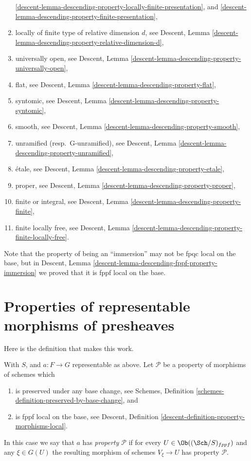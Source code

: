 \begin{remark}
\begin{enumerate}
\ref{descent-lemma-descending-property-locally-finite-presentation}, and
\ref{descent-lemma-descending-property-finite-presentation},
\item locally of finite type of relative dimension $d$, see
Descent,
Lemma \ref{descent-lemma-descending-property-relative-dimension-d},
\item universally open, see
Descent, Lemma \ref{descent-lemma-descending-property-universally-open},
\item flat, see
Descent, Lemma \ref{descent-lemma-descending-property-flat},
\item syntomic, see
Descent, Lemma \ref{descent-lemma-descending-property-syntomic},
\item smooth, see
Descent, Lemma \ref{descent-lemma-descending-property-smooth},
\item unramified (resp.\ G-unramified), see
Descent, Lemma \ref{descent-lemma-descending-property-unramified},
\item \'etale, see
Descent, Lemma \ref{descent-lemma-descending-property-etale},
\item proper, see
Descent, Lemma \ref{descent-lemma-descending-property-proper},
\item finite or integral, see
Descent, Lemma \ref{descent-lemma-descending-property-finite},
\item finite locally free, see
Descent,
Lemma \ref{descent-lemma-descending-property-finite-locally-free}.
\end{enumerate}
Note that the property of being an ``immersion'' may not be fpqc local
on the base, but in
Descent, Lemma \ref{descent-lemma-descending-fppf-property-immersion}
we proved that it is fppf local on the base.
\end{remark}








\section{Properties of representable morphisms of presheaves}
\label{section-representable-properties}

\noindent
Here is the definition that makes this work.

\begin{definition}
\label{definition-relative-representable-property}
With $S$, and $a : F \to G$ representable as above.
Let $\mathcal{P}$ be a property of morphisms of schemes which
\begin{enumerate}
\item is preserved under any base change,
see Schemes, Definition \ref{schemes-definition-preserved-by-base-change},
and
\item is fppf local on the base, see
Descent, Definition \ref{descent-definition-property-morphisms-local}.
\end{enumerate}
In this case we say that $a$ has {\it property $\mathcal{P}$} if for every
$U \in \Ob((\Sch/S)_{fppf})$ and
any $\xi \in G(U)$ the resulting morphism of schemes
$V_\xi \to U$ has property $\mathcal{P}$.
\end{definition}

